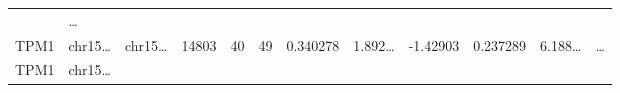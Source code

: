 \documentclass[
]{article}
\begin{document}
\begin{longtable}[]{@{}llllllllllll@{}}
\begin{minipage}[t]{0.09\columnwidth}
\end{minipage} & \begin{minipage}[t]{0.02\columnwidth}\raggedright
\ldots{}\strut
\end{minipage}\tabularnewline
\begin{minipage}[t]{0.06\columnwidth}\raggedright
TPM1\strut
\end{minipage} & \begin{minipage}[t]{0.06\columnwidth}\raggedright
chr15\ldots{}\strut
\end{minipage} & \begin{minipage}[t]{0.06\columnwidth}\raggedright
chr15\ldots{}\strut
\end{minipage} & \begin{minipage}[t]{0.06\columnwidth}\raggedright
14803\strut
\end{minipage} & \begin{minipage}[t]{0.06\columnwidth}\raggedright
40\strut
\end{minipage} & \begin{minipage}[t]{0.06\columnwidth}\raggedright
49\strut
\end{minipage} & \begin{minipage}[t]{0.06\columnwidth}\raggedright
0.340278\strut
\end{minipage} & \begin{minipage}[t]{0.08\columnwidth}\raggedright
1.892\ldots{}\strut
\end{minipage} & \begin{minipage}[t]{0.06\columnwidth}\raggedright
-1.42903\strut
\end{minipage} & \begin{minipage}[t]{0.06\columnwidth}\raggedright
0.237289\strut
\end{minipage} & \begin{minipage}[t]{0.09\columnwidth}\raggedright
6.188\ldots{}\strut
\end{minipage} & \begin{minipage}[t]{0.02\columnwidth}\raggedright
\ldots{}\strut
\end{minipage}\tabularnewline
\begin{minipage}[t]{0.06\columnwidth}\raggedright
TPM1\strut
\end{minipage} & \begin{minipage}[t]{0.06\columnwidth}\raggedright
chr15\ldots{}\strut
\end{minipage} & \begin{minipage}[t]{0.06\columnwidth}\raggedright

\end{minipage}
\end{longtable}
\end{document}

